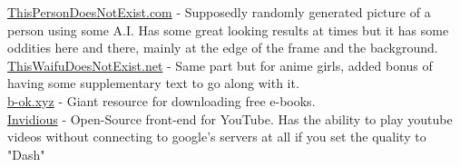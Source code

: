 \documentclass{article}
\begin{document}
\href{https://thispersondoesnotexist.com/}{ThisPersonDoesNotExist.com} - Supposedly randomly generated picture of a person using some A.I. Has some great looking results at times but it has some oddities here and there, mainly at the edge of the frame and the background.\\
\href{https://www.thiswaifudoesnotexist.net/}{ThisWaifuDoesNotExist.net} - Same part but for anime girls, added bonus of having some supplementary text to go along with it.\\
\href{https://b-ok.xyz/}{b-ok.xyz} - Giant resource for downloading free e-books.\\
\href{https://invidio.us/}{Invidious} - Open-Source front-end for YouTube. Has the ability to play youtube videos without connecting to google's servers at all if you set the quality to "Dash"\\
\end{document}
